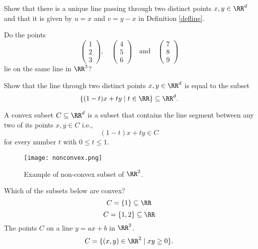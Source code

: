 \documentclass{article}
\begin{document}
\begin{exercise}[emph]
  Show that there is a unique line passing through two distinct points
    $x, y\in \RR^d$ and that it is given by $u = x$ and $v = y - x$ in Definition \ref{defline}.
\end{exercise}

    \beginshex
    Do the points
    $$
    \begin{pmatrix}1\\ 2\\ 3\end{pmatrix}, \quad \begin{pmatrix} 4\\ 5\\ 6\end{pmatrix}
    \quad\text{and}\quad \begin{pmatrix} 7\\ 8\\ 9\end{pmatrix}
    $$
    lie on the same line in $\RR^3$?
    \endshex
    
    \beginshex
    Show that the line through two distinct points $x, y\in \RR^d$ is equal to the subset
    $$
    \{ (1-t) x + t y \mid t\in \RR\} \subseteq \RR^d.
    $$
    \endshex
    

    \begin{definition}[emph]\label{Def:convexsubset}
    A convex subset $C\subseteq \RR^d$ is a subset that contains the
    line segment between any two of its points $x, y\in C$ i.e.,
    $$
    (1 - t) x + t y\in C
    $$
    for every number $t$ with $0\leq t \leq 1$.
    \end{definition}

\begin{figure}
  \texttt{[image: nonconvex.png]}
  \begin{center}
    Example of non-convex subset of $\RR^2$.
  \end{center}
\end{figure}


\begin{quizexercise}[showhide]
  \begin{quiz}
    \question
    Which of the subsets below are convex?
    $$C=\{1\}\subseteq \RR$$
    $$C=\{1, 2\}\subseteq \RR$$
    The points $C$ on a line $y = a x + b$ in $\RR^2$.
    $$
    C=\{(x, y)\in \RR^2 \mid x y \geq 0\}.
    $$
  \end{quiz}
\end{quizexercise}
\end{document}
